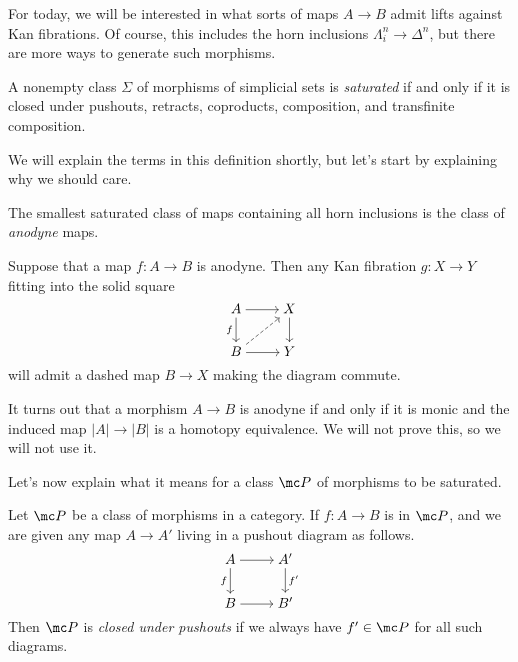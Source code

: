 \documentclass[../notes.tex]{subfiles}
\begin{document}
For today, we will be interested in what sorts of maps $A\to B$ admit lifts against Kan fibrations. Of course, this includes the horn inclusions $\Lambda^n_i\to\Delta^n$, but there are more ways to generate such morphisms.
\begin{definition}[saturated]
	A nonempty class $\Sigma$ of morphisms of simplicial sets is \textit{saturated} if and only if it is closed under pushouts, retracts, coproducts, composition, and transfinite composition.
\end{definition}
We will explain the terms in this definition shortly, but let's start by explaining why we should care.
\begin{definition}[anodyne]
	The smallest saturated class of maps containing all horn inclusions is the class of \textit{anodyne} maps.
\end{definition}
\begin{proposition}
	Suppose that a map $f\colon A\to B$ is anodyne. Then any Kan fibration $g\colon X\to Y$ fitting into the solid square
	\[\begin{tikzcd}[cramped]
		A & X \\
		B & Y
		\arrow[from=1-1, to=1-2]
		\arrow["f"', from=1-1, to=2-1]
		\arrow[from=1-2, to=2-2]
		\arrow[dashed, from=2-1, to=1-2]
		\arrow[from=2-1, to=2-2]
	\end{tikzcd}\]
	will admit a dashed map $B\to X$ making the diagram commute.
\end{proposition}
\begin{remark}
	It turns out that a morphism $A\to B$ is anodyne if and only if it is monic and the induced map $\left|A\right|\to\left|B\right|$ is a homotopy equivalence. We will not prove this, so we will not use it.
\end{remark}
Let's now explain what it means for a class $\mc P$ of morphisms to be saturated.
\begin{definition}
	Let $\mc P$ be a class of morphisms in a category. If $f\colon A\to B$ is in $\mc P$, and we are given any map $A\to A'$ living in a pushout diagram as follows.
	\[\begin{tikzcd}[cramped]
		A & {A'} \\
		B & {B'}
		\arrow[from=1-1, to=1-2]
		\arrow["f"', from=1-1, to=2-1]
		\arrow["{f'}", from=1-2, to=2-2]
		\arrow[from=2-1, to=2-2]
	\end{tikzcd}\]
	Then $\mc P$ is \textit{closed under pushouts} if we always have $f'\in\mc P$ for all such diagrams.
\end{definition}
\end{document}
